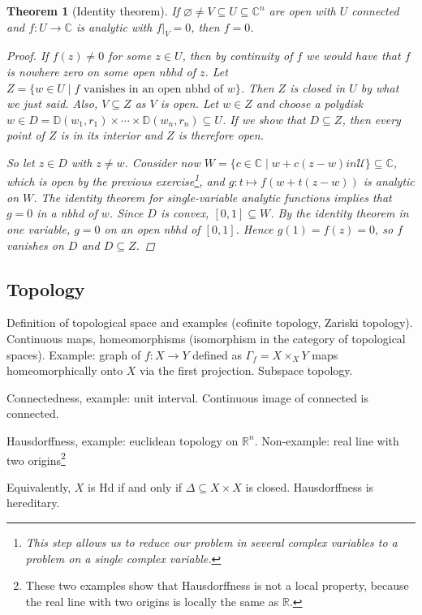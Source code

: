 \documentclass[12pt]{article}
\theoremstyle{darkgreentheorem}
\newtheorem{thm}{Theorem}
\theoremstyle{darkbluedefinition}
\theoremstyle{darkredexample}
\theoremstyle{remark}
\newcommand{\R}{\mathbb{R}}
\newcommand{\1}{\mathbbm{1}}
\newcommand{\C}{\mathbb{C}}
\newcommand{\bbD}{\mathbb{D}}
\newcommand{\U}{\mathcal{U}}
\newcommand{\fp}[1]{\times_{#1}}
\begin{document}
\begin{thm}[Identity theorem]
    If $\varnothing \neq V\subseteq U\subseteq \C^{n}$ are open with $U$ connected and $f\colon U\to \C$ is analytic with $f|_{V}=0$, then $f=0$.
    \begin{proof}
	If $f(z)\neq 0$ for some $z\in U$, then by continuity of $f$ we would have that $f$ is nowhere zero on some open nbhd of $z$.
	Let $Z=\{w\in U\mid f \text{ vanishes in an open nbhd of }w\}$.
	Then $Z$ is closed in $U$ by what we just said.
	Also, $V\subseteq Z$ as $V$ is open.
	Let $w\in Z$ and choose a polydisk $w\in D=\bbD(w_{1},r_{1})\times \cdots \times \bbD(w_{n},r_{n})\subseteq U$.
	If we show that $D\subseteq Z$, then every point of $Z$ is in its interior and $Z$ is therefore open.
	
	So let $z\in D$ with $z\neq w$.
	Consider now $W=\{c\in \C\mid w+c(z-w)in \U\}\subseteq \C$, which is open by the previous exercise\footnote{This step allows us to reduce our problem in several complex variables to a problem on a single complex variable.}, and $g\colon t\mapsto f(w+t(z-w))$ is analytic on $W$.
	The identity theorem for single-variable analytic functions implies that $g=0$ in a nbhd of $w$.
	Since $D$ is convex, $[0,1]\subseteq W$.
	By the identity theorem in one variable, $g=0$ on an open nbhd of $[0,1]$.
	Hence $g(1)=f(z)=0$, so $f$ vanishes on $D$ and $D\subseteq Z$.
    \end{proof}
\end{thm}

\subsection{Topology}

Definition of topological space and examples (cofinite topology, Zariski topology).
Continuous maps, homeomorphisms (isomorphism in the category of topological spaces).
Example: graph of $f\colon X\to Y$ defined as $\Gamma_{f}=X\fp{X}Y$ maps homeomorphically onto $X$ via the first projection.
Subspace topology.

Connectedness, example: unit interval.
Continuous image of connected is connected.

Hausdorffness, example: euclidean topology on $\R^{n}$.
Non-example: real line with two origins\footnote{These two examples show that Hausdorffness is not a local property, because the real line with two origins is locally the same as $\R$.}

Equivalently, $X$ is Hd if and only if $\Delta\subseteq X\times X$ is closed.
Hausdorffness is hereditary.
\end{document}
